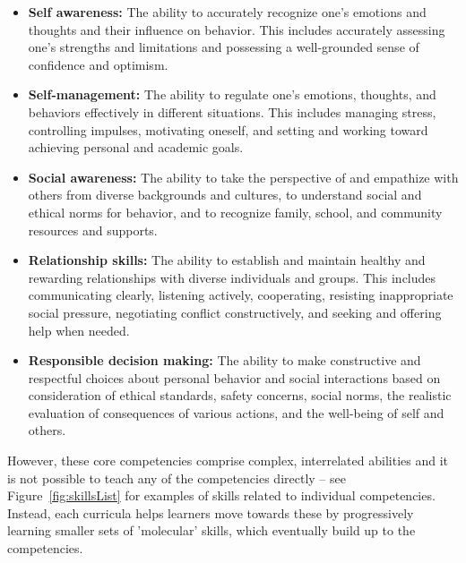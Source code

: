 \documentclass[prodmode,acmtochi]{acmsmall}
\newcommand{\todo}[1]{\textrm{\textrm{\textcolor{LightBlue}{[[#1]]}}}}
\begin{document}
%
%
\begin{itemize}
        \item {\bf Self awareness: }
                        The ability to accurately recognize one’s emotions and thoughts and their influence on behavior. This includes accurately assessing one’s strengths and limitations and possessing a well-grounded sense of confidence and optimism.
        \item {\bf Self-management: }
                         The ability to regulate one’s emotions, thoughts, and behaviors effectively in different situations. This includes managing stress, controlling impulses, motivating oneself, and setting and working toward achieving personal and academic goals.
        \item {\bf Social awareness: }
                         The ability to take the perspective of and empathize with others from diverse backgrounds and cultures, to understand social and ethical norms for behavior, and to recognize family, school, and community resources and supports.
        \item {\bf Relationship skills: }
                        The ability to establish and maintain healthy and rewarding relationships with diverse individuals and groups. This includes communicating clearly, listening actively, cooperating, resisting inappropriate social pressure, negotiating conflict constructively, and seeking and offering help when needed.
        \item {\bf Responsible decision making: }
                        The ability to make constructive and respectful choices about personal behavior and social interactions based on consideration of ethical standards, safety concerns, social norms, the realistic evaluation of consequences of various actions, and the well-being of self and others.
\end{itemize}
However, these core competencies comprise complex, interrelated abilities and it is not possible to teach any of the competencies directly -- see Figure~\ref{fig:skillsList} for examples of skills related to individual competencies. 
Instead, each curricula helps learners move towards these by progressively learning smaller sets of 'molecular' skills, which eventually build up to the competencies. 
\end{document}
